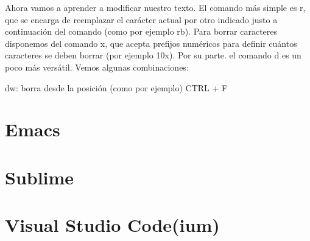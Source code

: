 Ahora vamos a aprender a modificar nuestro texto. El comando
más simple es r, que se encarga de reemplazar el carácter
actual por otro indicado justo a continuación del comando
(como por ejemplo rb). Para borrar caracteres disponemos del
comando x, que acepta prefijos numéricos para definir cuántos
caracteres se deben borrar (por ejemplo 10x). Por su parte. el
comando d es un poco más versátil. Vemos algunas combinaciones:

dw: borra desde la posición
(como por ejemplo)
CTRL + F

\lipsum[1]
\begin{figure}
	
\end{figure}
\lipsum[1]

\section{Emacs}

\lipsum[1]
\begin{figure}
	
\end{figure}
\lipsum[1]

\section{Sublime}

\lipsum[1]
\begin{figure}
	
\end{figure}
\lipsum[1]

\section{Visual Studio Code(ium)}

